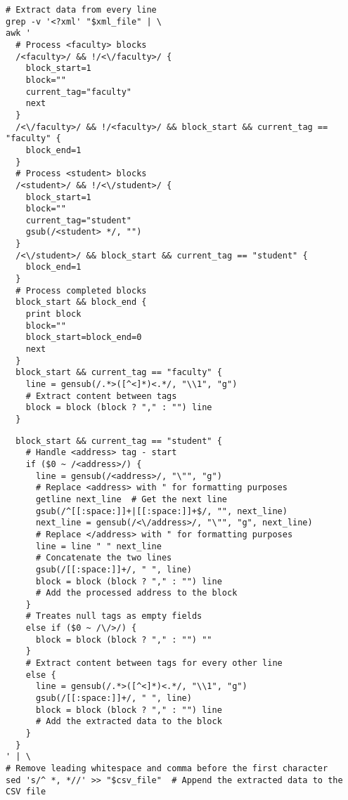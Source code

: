 \documentclass[12pt]{article}
\begin{document}
\begin{tcolorbox}[
    enhanced,
    attach boxed title to top left={xshift=6mm,yshift=-3mm},
    colback=lightgreen!20,
    colframe=lightgreen,
    colbacktitle=lightgreen,
    title=Bash Script,
    fonttitle=\bfseries\color{black},
    boxed title style={size=small,colframe=lightgreen,sharp corners},
    sharp corners,
]
\begin{verbatim}
# Extract data from every line
grep -v '<?xml' "$xml_file" | \
awk '
  # Process <faculty> blocks
  /<faculty>/ && !/<\/faculty>/ {
    block_start=1
    block=""
    current_tag="faculty"
    next
  }
  /<\/faculty>/ && !/<faculty>/ && block_start && current_tag == "faculty" {
    block_end=1
  }
  # Process <student> blocks
  /<student>/ && !/<\/student>/ {
    block_start=1
    block=""
    current_tag="student"
    gsub(/<student> */, "")
  }
  /<\/student>/ && block_start && current_tag == "student" {
    block_end=1
  }
  # Process completed blocks
  block_start && block_end {
    print block
    block=""
    block_start=block_end=0
    next
  }
  block_start && current_tag == "faculty" {
    line = gensub(/.*>([^<]*)<.*/, "\\1", "g")  
    # Extract content between tags
    block = block (block ? "," : "") line
  }
\end{verbatim}
\end{tcolorbox}
\begin{tcolorbox}[
    enhanced,
    attach boxed title to top left={xshift=6mm,yshift=-3mm},
    colback=lightgreen!20,
    colframe=lightgreen,
    colbacktitle=lightgreen,
    title=Bash Script,
    fonttitle=\bfseries\color{black},
    boxed title style={size=small,colframe=lightgreen,sharp corners},
    sharp corners,
]
\begin{verbatim}
  block_start && current_tag == "student" {
    # Handle <address> tag - start
    if ($0 ~ /<address>/) {
      line = gensub(/<address>/, "\"", "g")  
      # Replace <address> with " for formatting purposes
      getline next_line  # Get the next line
      gsub(/^[[:space:]]+|[[:space:]]+$/, "", next_line)
      next_line = gensub(/<\/address>/, "\"", "g", next_line)
      # Replace </address> with " for formatting purposes
      line = line " " next_line  
      # Concatenate the two lines
      gsub(/[[:space:]]+/, " ", line)
      block = block (block ? "," : "") line
      # Add the processed address to the block
    }
    # Treates null tags as empty fields
    else if ($0 ~ /\/>/) {
      block = block (block ? "," : "") ""
    }
    # Extract content between tags for every other line
    else {
      line = gensub(/.*>([^<]*)<.*/, "\\1", "g")
      gsub(/[[:space:]]+/, " ", line)
      block = block (block ? "," : "") line  
      # Add the extracted data to the block
    }
  }
' | \
# Remove leading whitespace and comma before the first character
sed 's/^ *, *//' >> "$csv_file"  # Append the extracted data to the CSV file


\end{verbatim}
\end{tcolorbox}
\end{document}
